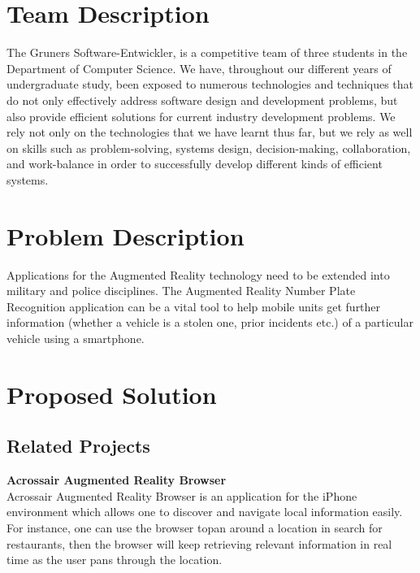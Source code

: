 \documentclass[12pt]{article}
\begin{document}
                \section{Team Description}
                The Gruners Software-Entwickler, is a competitive team of three students in the Department of Computer Science. We have, throughout our different years of undergraduate study, been exposed to numerous technologies and techniques that do not only effectively address software design and development problems, but also provide efficient solutions for current industry development problems. We rely not only on the technologies that we have learnt thus far, but we rely as well on skills such as problem-solving, systems design, decision-making, collaboration, and work-balance in order to successfully develop different kinds of efficient systems.
                
                \newpage
                \section{Problem Description}
                Applications for the Augmented Reality technology need to be extended into military and police disciplines. The Augmented Reality Number Plate Recognition application can be a vital tool to help mobile units get further information (whether a vehicle is a stolen one, prior incidents etc.) of a particular vehicle using a smartphone.
                
                \newpage
                 
               \section{Proposed Solution}
                  	\subsection{Related Projects}
      	                  \textbf{ Acrossair Augmented Reality Browser}\\
      	                   Acrossair Augmented Reality Browser is an application for the iPhone environment which allows one to discover and navigate local information easily. For instance, one can use the browser topan around a location in search for restaurants, then the browser will keep retrieving relevant information in real time as the user pans through the location.
\end{document}
